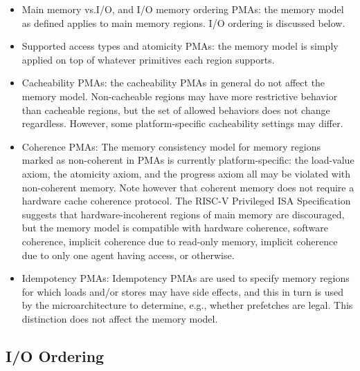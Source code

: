 \begin{itemize}
  \item Main memory vs.\@ I/O, and I/O memory ordering PMAs: the memory model as defined applies to main memory regions.  I/O ordering is discussed below.
  \item Supported access types and atomicity PMAs: the memory model is simply applied on top of whatever primitives each region supports.
  \item Cacheability PMAs: the cacheability PMAs in general do not affect the memory model.  Non-cacheable regions may have more restrictive behavior than cacheable regions, but the set of allowed behaviors does not change regardless.  However, some platform-specific cacheability settings may differ.
  \item Coherence PMAs: The memory consistency model for memory regions marked as non-coherent in PMAs is currently platform-specific: the load-value axiom, the atomicity axiom, and the progress axiom all may be violated with non-coherent memory.  Note however that coherent memory does not require a hardware cache coherence protocol.  The RISC-V Privileged ISA Specification suggests that hardware-incoherent regions of main memory are discouraged, but the memory model is compatible with hardware coherence, software coherence, implicit coherence due to read-only memory, implicit coherence due to only one agent having access, or otherwise.
  \item Idempotency PMAs: Idempotency PMAs are used to specify memory regions for which loads and/or stores may have side effects, and this in turn is used by the microarchitecture to determine, e.g., whether prefetches are legal.  This distinction does not affect the memory model.
\end{itemize}


\subsection{I/O Ordering}

